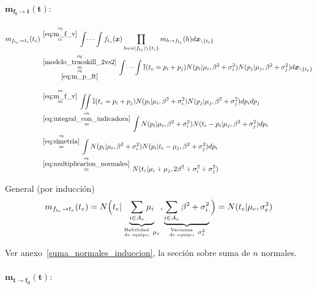 \documentclass[article]{jss}
\newcommand\hfrac[2]{\genfrac{}{}{0pt}{}{#1}{#2}} %
\begin{document}
\begin{appendix}
\paragraph{$\bm{m_{f_t \rightarrow t}(t)}:$}

\begin{equation}
\begin{split}
 m_{f_{t_e} \rightarrow t_e}(t_e) & \overset{\hfrac{\text{eq}}{\ref{eq:m_f_v}}}{=} \int \dots \int f_{t_e}(\bm{x}) \prod_{h \in n(f_{t_e}) \setminus \{t_e\} } m_{h \rightarrow f_{t_e}}(h) d\bm{x}_{\setminus \{t_e\} }  \\
 & \overset{\hfrac{\text{fig}}{\ref{modelo_trueskill_2vs2}}}{\underset{\hfrac{\text{eq}}{\ref{eq:m_p_ft}}}{=}} \int \dots \int \mathbb{I}(t_e = p_i + p_j) N(p_i|\mu_i,\beta^2 + \sigma_i^2)N(p_j|\mu_j,\beta^2 + \sigma_j^2) d\bm{x}_{\setminus \{t_e\} }\\[0.3cm]
 & \overset{\hfrac{\text{eq}}{\ref{eq:m_f_v}}}{=} \iint \mathbb{I}(t_e = p_i + p_j) N(p_i|\mu_i,\beta^2 + \sigma_i^2)N(p_j|\mu_j,\beta^2 + \sigma_j^2) dp_idp_j \\
 & \overset{\hfrac{\text{eq}}{\ref{eq:integral_con_indicadora}}}{=} \int N(p_i|\mu_i,\beta^2 + \sigma_i^2) N(t_e - p_i|\mu_j,\beta^2 + \sigma_j^2) dp_i   \\
 & \overset{\hfrac{\text{eq}}{\ref{eq:simetria}}}{=} \int N(p_i|\mu_i,\beta^2 + \sigma_i^2) N(p_i|t_e - \mu_j,\beta^2 + \sigma_j^2) dp_i \\
 & \overset{\hfrac{\text{eq}}{\ref{eq:multiplicacion_normales}}}{=} N(t_e|\mu_i+\mu_j,2\beta^2 + \sigma_i^2 + \sigma_j^2)
\end{split}
\end{equation}

\vspace{0.3cm}

General (por inducci\'on)
\begin{equation}\label{eq:m_ft_t}
 m_{f_{t_e} \rightarrow t_e}(t_e) =  N \Big( t_e | \underbrace{\sum_{i\in A_e } \mu_i}_{\hfrac{\text{Habilidad}}{\text{de equipo}} \ \mu_e}, \underbrace{\sum_{i \in A_e} \beta^2 + \sigma_i^2}_{\hfrac{\text{Varianza}}{\text{de equipo}} \ \sigma_e^2} \Big) = N(t_e | \mu_e, \sigma_e^2)
\end{equation}

Ver anexo~\ref{suma_normales_induccion}, la secci\'on sobre suma de $n$ normales.

\paragraph{$\bm{m_{t \rightarrow f_d}(t)}:$}


\end{appendix}
\end{document}
